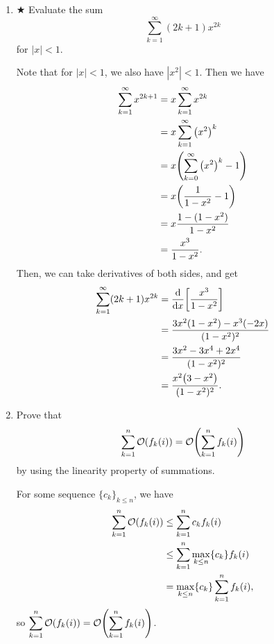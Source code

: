 \documentclass[AppendixA]{subfiles}
\begin{document}
\begin{enumerate}[leftmargin=\labelsep]
		\item $\bigstar$ Evaluate the sum
		\[
			\sum_{k = 1}^\infty (2k + 1)x^{2k}
		\]
		for $|x| < 1$.
		\begin{answer}
			Note that for $|x| < 1$, we also have $|x^2| < 1$. Then we have
			\begin{align*}
				\sum_{k = 1}^\infty x^{2k+1} &= x\sum_{k = 1}^\infty x^{2k}\\
					&= x\sum_{k = 1}^\infty \qty(x^2)^k\\
					&= x\qty(\sum_{k = 0}^\infty \qty(x^2)^k - 1)\\
					&= x\qty(\frac{1}{1 - x^2} - 1)\\
					&= x\frac{1 - (1 - x^2)}{1 - x^2}\\
					&= \frac{x^3}{1 - x^2}.
			\end{align*}
			Then, we can take derivatives of both sides, and get
			\begin{align*}
				\sum_{k = 1}^\infty (2k+1)x^{2k} &= \dv{}{x} \qty[\frac{x^3}{1 - x^2}]\\
					&= \frac{3x^2(1 - x^2) - x^3(-2x)}{(1 - x^2)^2}\\
					&= \frac{3x^2 - 3x^4 + 2x^4}{(1 - x^2)^2}\\
					&= \frac{x^2\qty(3 - x^2)}{(1 - x^2)^2}.
			\end{align*}
		\end{answer}
		
		\item Prove that
		\[
			\sum_{k = 1}^n \mathcal{O}(f_k(i)) = \mathcal{O}\qty(\sum_{k = 1}^n f_k(i))
		\]
		by using the linearity property of summations.
		\begin{answer}
			For some sequence $\{c_k\}_{k \leq n}$, we have
			\begin{align*}
				\sum_{k = 1}^n \mathcal{O}(f_k(i)) &\leq \sum_{k = 1}^n c_kf_k(i)\\
					&\leq \sum_{k = 1}^n \max_{k \leq n}\{c_k\}f_k(i)\\
					&= \max_{k \leq n}\{c_k\} \sum_{k = 1}^n f_k(i),
			\end{align*}
			so $ \displaystyle \sum_{k = 1}^n \mathcal{O}(f_k(i)) = \mathcal{O}\qty(\sum_{k = 1}^n f_k(i))$.
		\end{answer}
		

\end{enumerate}
\end{document}
